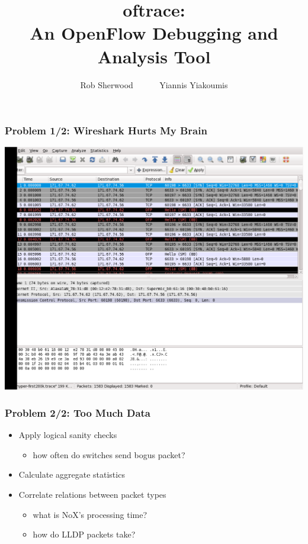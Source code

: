 \documentclass[14pt]{beamer}
\title{oftrace:\\An OpenFlow Debugging and Analysis Tool}
\author{Rob Sherwood ~~~~~ Yiannis Yiakoumis  }
\institute{Stanford Clean Slate Lab}
\newcommand{\subbullet}[1]{\begin{itemize}\item #1\end{itemize}}
\begin{document}
\maketitle

\begin{frame}
\frametitle{Problem 1/2: Wireshark Hurts My Brain}
\begin{center}
\includegraphics[height=.90\textheight]{figures/wireshark}
\end{center}
\end{frame}
\begin{frame}
\frametitle{Problem 2/2: Too Much Data }
\begin{itemize}
\item Apply logical sanity checks
\subbullet{how often do switches send bogus packet? }
\item Calculate aggregate statistics
\item Correlate relations between packet types
\begin{itemize}
\item what is NoX's processing time?
\item how do LLDP packets take?
\end{itemize}
\end{itemize}
\end{frame}
\end{document}
